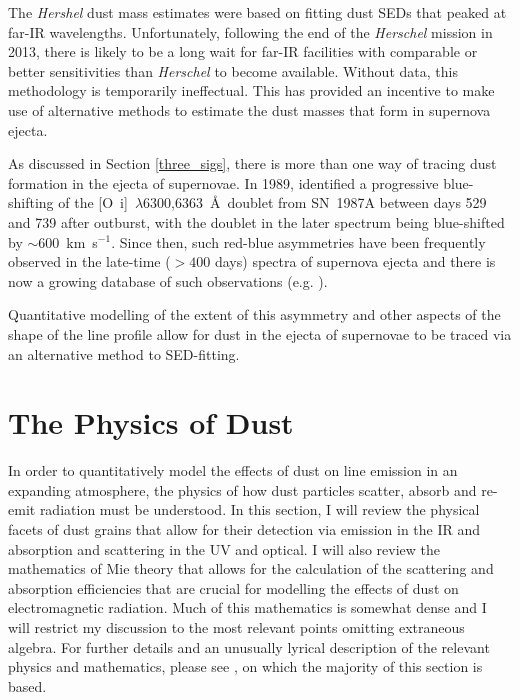 The {\em Hershel} dust mass estimates were based on fitting dust SEDs that peaked at far-IR wavelengths. Unfortunately, following the end of the {\em Herschel} mission in 2013, there is likely to be a long wait for far-IR facilities with comparable or better sensitivities than {\em Herschel} to become available.  Without data, this methodology is temporarily ineffectual.  This has provided an incentive to make use of alternative methods to estimate the dust masses that form in supernova ejecta.

As discussed in Section \ref{three_sigs}, there is more than one way of tracing dust formation in the ejecta of supernovae.  In 1989, \citeauthor{Lucy1989} identified a progressive blue-shifting of the [O~{\sc i}]~$\lambda$6300,6363~\AA\ doublet from SN~1987A between days 529 and 739 after outburst, with the doublet in the later spectrum being blue-shifted by $\sim 600 $~km~s$^{-1}$. Since then, such red-blue asymmetries have been frequently observed in the late-time ($ > 400$ days) spectra of supernova ejecta and there is now a growing database of such observations (e.g. \citet{Lucy1989,Fabbri2011,Mauerhan2012,Milisavljevic2012}).

Quantitative modelling of the extent of this asymmetry and other aspects of the shape of the line profile allow for dust in the ejecta of supernovae to be traced via an alternative method to SED-fitting.  

\section{The Physics of Dust}

In order to quantitatively model the effects of dust on line emission in an expanding atmosphere, the physics of how dust particles scatter, absorb and re-emit radiation must be understood. In this section, I will review the physical facets of dust grains that allow for their detection via emission in the IR and absorption and scattering in the UV and optical.  I will also review the mathematics of Mie theory \citep{Mie1908} that allows for the calculation of the scattering and absorption efficiencies that are crucial for modelling the effects of dust on electromagnetic radiation.  Much of this mathematics is somewhat dense and I will restrict my discussion to the most relevant points omitting extraneous algebra.  For further details and an unusually lyrical description of the relevant physics and mathematics, please see \citet{Bohren1983}, on which the majority of this section is based.  

